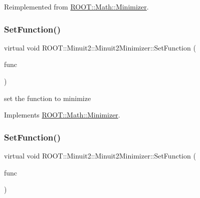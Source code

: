 Reimplemented from \mbox{\hyperlink{classROOT_1_1Math_1_1Minimizer_a063e9d83c8a61afc8798ebb1d74b6f2b}{R\+O\+O\+T\+::\+Math\+::\+Minimizer}}.

\mbox{\label{classROOT_1_1Minuit2_1_1Minuit2Minimizer_ae18efc66a943fe11b1114ff8c1b28ad0}} 
\subsubsection{\texorpdfstring{SetFunction()}{SetFunction()}\hspace{0.1cm}{\footnotesize\ttfamily [1/4]}}
{\footnotesize\ttfamily virtual void R\+O\+O\+T\+::\+Minuit2\+::\+Minuit2\+Minimizer\+::\+Set\+Function (\begin{DoxyParamCaption}\item[{const \mbox{\hyperlink{namespaceROOT_1_1Math_aec22897f3d759f7c284893c81d980799}{R\+O\+O\+T\+::\+Math\+::\+I\+Multi\+Gen\+Function}} \&}]{func }\end{DoxyParamCaption})\hspace{0.3cm}{\ttfamily [virtual]}}



set the function to minimize 



Implements \mbox{\hyperlink{classROOT_1_1Math_1_1Minimizer_a4391c613ab0c3f9777e56b487ffa5eac}{R\+O\+O\+T\+::\+Math\+::\+Minimizer}}.

\mbox{\label{classROOT_1_1Minuit2_1_1Minuit2Minimizer_ae18efc66a943fe11b1114ff8c1b28ad0}} 
\subsubsection{\texorpdfstring{SetFunction()}{SetFunction()}\hspace{0.1cm}{\footnotesize\ttfamily [2/4]}}
{\footnotesize\ttfamily virtual void R\+O\+O\+T\+::\+Minuit2\+::\+Minuit2\+Minimizer\+::\+Set\+Function (\begin{DoxyParamCaption}\item[{const \mbox{\hyperlink{namespaceROOT_1_1Math_aec22897f3d759f7c284893c81d980799}{R\+O\+O\+T\+::\+Math\+::\+I\+Multi\+Gen\+Function}} \&}]{func }\end{DoxyParamCaption})\hspace{0.3cm}{\ttfamily [virtual]}}



